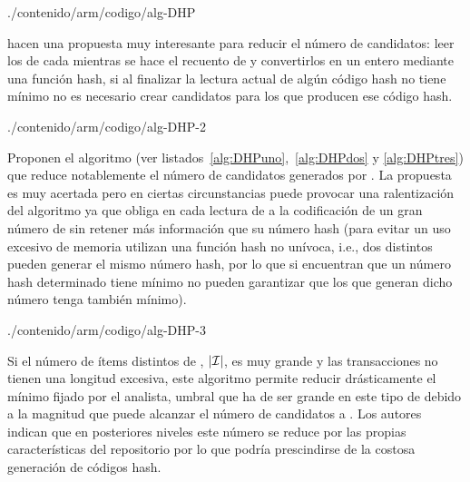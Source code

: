 

                 {./contenido/arm/codigo/alg-DHP}                 

\citet{ParkChenYu-AnEffectiveHashBasedAlgorithmForARM-1995} hacen una propuesta muy interesante para reducir el número de candidatos: leer los \kitemsets[(k+1)] de cada \transaccion mientras se hace el recuento de \aprioriC y convertirlos en un entero mediante una función hash, si al finalizar la lectura actual de \D algún código hash no tiene \soporte mínimo no es necesario crear candidatos para los \kitemsets[(k+1)] que producen ese código hash.


                 {./contenido/arm/codigo/alg-DHP-2}

Proponen el algoritmo  (ver listados~\ref{alg:DHPuno},~\ref{alg:DHPdos} y \ref{alg:DHPtres}) que reduce notablemente el número de candidatos generados por \apriori. La propuesta es muy acertada pero en ciertas circunstancias puede provocar una ralentización del algoritmo ya que obliga en cada lectura de \D a la codificación de un gran número de \kitemsets[(k+1)] sin retener más información que su número hash (para evitar un uso excesivo de memoria utilizan una función hash no unívoca, i.e., dos \kitemsets[(k+1)] distintos pueden generar el mismo número hash, por lo que si encuentran que un número hash determinado tiene \soporte mínimo no pueden garantizar que los \itemsets que generan dicho número tenga también \soporte mínimo).


                 {./contenido/arm/codigo/alg-DHP-3}

Si el número de ítems distintos de \D, $|\I|$, es muy grande y las transacciones no tienen una longitud excesiva, este algoritmo permite reducir drásticamente el \soporte mínimo fijado por el analista, umbral que ha de ser grande en este tipo de \datasets debido a la magnitud que puede alcanzar el número de candidatos a \kitemsets[2]. Los autores indican que en posteriores niveles este número se reduce por las propias características del repositorio por lo que podría prescindirse de la costosa generación de códigos hash.

